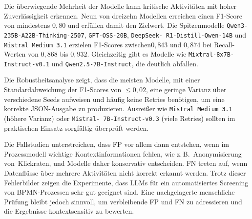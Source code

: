 Die überwiegende Mehrheit der Modelle kann kritische Aktivitäten mit hoher Zuverlässigkeit erkennen. Neun von dreizehn Modellen erreichen einen F1-Score von mindestens $0{,}80$ und erfüllen damit den Zielwert. Die Spitzenmodelle \texttt{Qwen3-235B-A22B-Thinking-2507}, \texttt{GPT-OSS-20B}, \texttt{DeepSeek-\linebreak~R1-Distill-Qwen-14B} und \texttt{Mistral Medium 3.1} erzielen F1-Scores zwischen\linebreak$0{,}843$ und $0{,}874$ bei Recall-Werten von $0{,}868$ bis $0{,}932$. Gleichzeitig gibt es Modelle wie \texttt{Mixtral-8x7B-Instruct-v0.1} und \texttt{Qwen2.5-7B-Instruct}, die deutlich abfallen.

Die Robustheitsanalyse zeigt, dass die meisten Modelle, mit einer Standardabweichung der F1-Scores von $\leq 0{,}02$, eine geringe Varianz über verschiedene Seeds aufweisen und häufig keine Retries benötigen, um eine korrekte JSON-Ausgabe zu produzieren. Ausreißer wie \texttt{Mistral Medium 3.1} (höhere Varianz) oder \texttt{Mistral-\linebreak~7B-Instruct-v0.3} (viele Retries) sollten im praktischen Einsatz sorgfältig überprüft werden.

Die Fallstudien unterstreichen, dass \ac{FP} vor allem dann entstehen, wenn im Prozessmodell wichtige Kontextinformationen fehlen, wie z.\,B.\ Anonymisierung von\linebreak~Klickraten, und Modelle daher konservativ entscheiden. \ac{FN} treten auf, wenn Datenflüsse über mehrere Aktivitäten nicht korrekt erkannt werden. Trotz dieser Fehlerbilder zeigen die Experimente, dass \acp{LLM} für ein automatisiertes Screening von \ac{BPMN}-Prozessen sehr gut geeignet sind. Eine nachgelagerte menschliche Prüfung bleibt jedoch sinnvoll, um verbleibende \ac{FP} und \ac{FN} zu adressieren und die Ergebnisse kontextsensitiv zu bewerten.